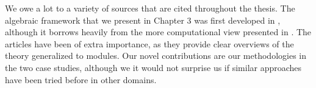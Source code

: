 We owe a lot to a variety of sources that are cited throughout the thesis. The algebraic framework that we present in Chapter 3 was first developed in \cite{Zomorodian2005}, although it borrows heavily from the more computational view presented in \cite{edelszom}. The articles \cite{vejdemo,skraba} have been of extra importance, as they provide clear overviews of the theory generalized to modules. Our novel contributions are our methodologies in the two case studies, although we it would not surprise us if similar approaches have been tried before in other domains.


